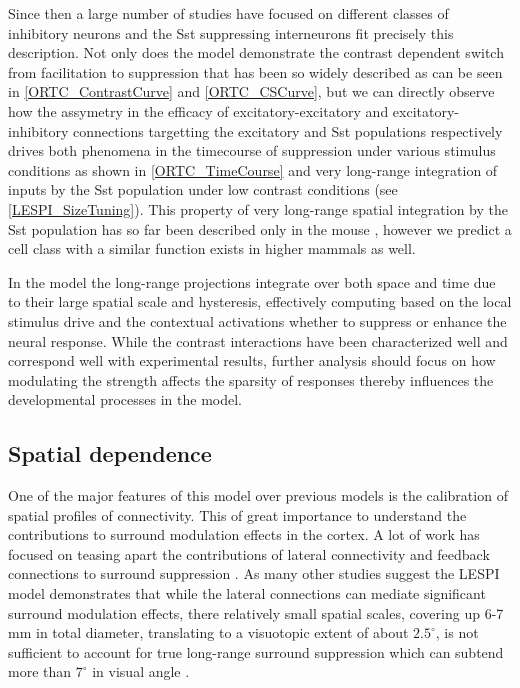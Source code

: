 Since then a large number of studies have focused on different classes
of inhibitory neurons and the Sst suppressing interneurons fit
precisely this description. Not only does the model demonstrate the
contrast dependent switch from facilitation to suppression that has
been so widely described \citep{Levitt1997, Polat1998, Dragoi2000,
  Wang2009} as can be seen in \ref{ORTC_ContrastCurve} and
\ref{ORTC_CSCurve}, but we can directly observe how the assymetry in
the efficacy of excitatory-excitatory and excitatory-inhibitory
connections targetting the excitatory and Sst populations respectively
drives both phenomena in the timecourse of suppression under various
stimulus conditions as shown in \ref{ORTC_TimeCourse} and very
long-range integration of inputs by the Sst population under low
contrast conditions (see \ref{LESPI_SizeTuning}). This property of
very long-range spatial integration by the Sst population has so far
been described only in the mouse \citep{Adesnik2012}, however we
predict a cell class with a similar function exists in higher mammals
as well.

In the model the long-range projections integrate over both space and
time due to their large spatial scale and hysteresis, effectively
computing based on the local stimulus drive and the contextual
activations whether to suppress or enhance the neural response. While
the contrast interactions have been characterized well and correspond
well with experimental results, further analysis should focus on how
modulating the strength affects the sparsity of responses thereby
influences the developmental processes in the model.

\subsection{Spatial dependence}

One of the major features of this model over previous models is the
calibration of spatial profiles of connectivity. This of great
importance to understand the contributions to surround modulation
effects in the cortex. A lot of work has focused on teasing apart the
contributions of lateral connectivity and feedback connections to
surround suppression \citep{Angelucci2002, Bair2003, Schwabe2006}. As
many other studies suggest the LESPI model demonstrates that while the
lateral connections can mediate significant surround modulation
effects, there relatively small spatial scales, covering up 6-7 mm in
total diameter, translating to a visuotopic extent of about
$2.5^\circ$, is not sufficient to account for true long-range surround
suppression which can subtend more than $7^\circ$ in visual angle
\citep{Bair2003, Levitt2002}.

